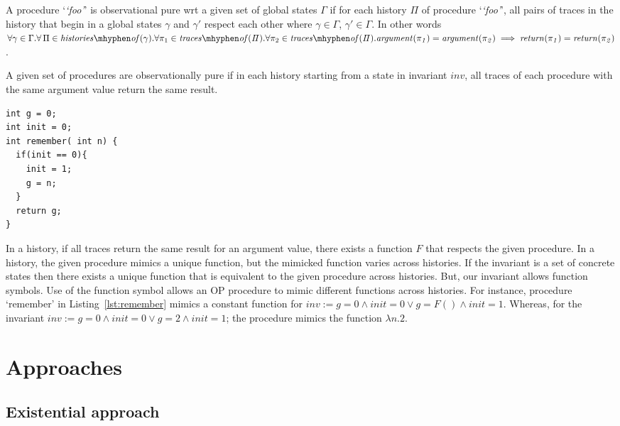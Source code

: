 \documentclass{llncs}
\newcommand{\foo}{\textit{`foo'}}
\newcommand{\trace}{\pi}
\newcommand{\inv}{\mathit{inv}}
\newcommand{\history}{\Pi}
\newcommand{\F}{\mathit{F}}
\newcommand{\gstate}{\gamma}
\newcommand{\return}[1]{\mathit{return(#1)}}
\newcommand{\param}[1]{\mathit{argument(#1)}}
\newcommand{\Gstates}{\Gamma}
\newcommand{\historyOf}[1]{\mathit{histories \mhyphen of(#1)}}
\newcommand{\tracesOf}[1]{\mathit{traces \mhyphen of(#1)}}
\begin{document}
\begin{definition}
  A procedure `\foo' is observational pure wrt a given set of global
states $\Gstates$ if for each history $\history$ of procedure `\foo',
all pairs of traces in the history that begin in a global states
$\gstate$ and $\gstate'$ respect each other where
$\gstate \in 
 \Gstates$, $\gstate' \in \Gstates$.  In other words $\forall \gstate
\in \Gstates.\forall \, \history \in \historyOf{\gstate}. \forall
\trace_1 \in \tracesOf{\history}. \forall \trace_2 \in
\tracesOf{\history}. \param{\trace_1} = \param{\trace_2} \implies
\return{\trace_1} = \return{\trace_2}$.
\end{definition}

\begin{definition}[observational purity(invariant $\inv$)]
 A given set of procedures are observationally pure if in each history
 starting from a state in invariant $\inv$, all traces of each
 procedure with the same argument value return the same result.
\end{definition}

\begin{lstlisting}[caption={Procedure `remember' : always returns the
      argument from its first call}, label=lst:remember]
int g = 0;
int init = 0;
int remember( int n) {
  if(init == 0){
    init = 1;
    g = n;
  }
  return g;
}
\end{lstlisting}

In a history, if all traces return the same result for an argument
value, there exists a function $\F$ that respects the given
procedure. In a history, the given procedure mimics a unique function,
but the mimicked function varies across histories. If the invariant is
a set of concrete states then there exists a unique function that is
equivalent to the given procedure across histories. But, our invariant
allows function symbols. Use of the function symbol allows an OP
procedure to mimic different functions across histories. For instance,
procedure `remember' in Listing~\ref{lst:remember} mimics a constant
function for $\inv := g=0 \wedge init=0 \vee g= \F() \wedge
init=1$. Whereas, for the invariant $\inv := g=0 \wedge init=0 \vee
g=2 \wedge init=1$; the procedure mimics the function $\lambda n.2$.

\section{Approaches} \label{sec:approaches}
\subsection{Existential approach}\label{sec:existential}
\end{document}
